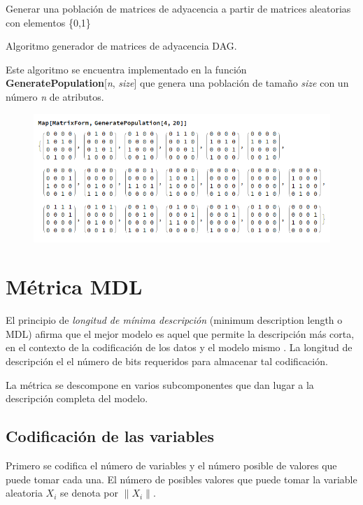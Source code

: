 \documentclass[10pt,a4paper]{article}
\begin{document}
\begin{algorithm}[H]
 Generar una población de matrices de adyacencia a partir de matrices aleatorias con elementos \{0,1\}\;
 \caption{Algoritmo generador de matrices de adyacencia DAG.}
\end{algorithm}

Este algoritmo se encuentra implementado en la función \textbf{GeneratePopulation}[\textit{n}, \textit{size}] que genera una población de tamaño \textit{size} con un número \textit{n} de atributos.

\begin{figure}[h!tb!]
\centering
    \includegraphics[scale=0.45]{img/population_gen.png}
\end{figure}

\section{Métrica MDL} \label{sec:mdl}
El principio de \textit{longitud de mínima descripción} (minimum description length o MDL) afirma que el mejor modelo es aquel que permite la descripción más corta, en el contexto de la codificación de los datos y el modelo mismo \cite{MDL}. La longitud de descripción el el número de bits requeridos para almacenar tal codificación.

La métrica se descompone en varios subcomponentes que dan lugar a la descripción completa del modelo.

\subsection{Codificación de las variables} 
Primero se codifica el número de variables y el número posible de valores que puede tomar cada una. El número de posibles valores que puede tomar la variable aleatoria $X_i$ se denota por $\| X_i \|$.
\end{document}
